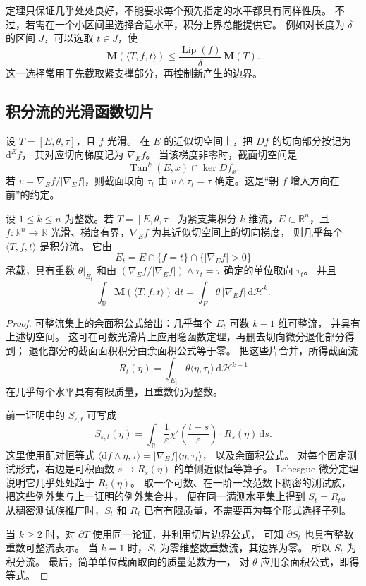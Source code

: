 定理只保证几乎处处良好，不能要求每个预先指定的水平都具有同样性质。
不过，若需在一个小区间里选择合适水平，积分上界总能提供它。
例如对长度为 \(\delta\) 的区间 \(J\)，可以选取 \(t\in J\)，使
\[
 \mathbf M(\langle T,f,t\rangle)
       \leq \frac{\operatorname{Lip}(f)}{\delta}\,\mathbf M(T).
\]
这一选择常用于先截取紧支撑部分，再控制新产生的边界。

\subsection{积分流的光滑函数切片}
\label{b1:subsec:D10402}

设 \(T=[E,\theta,\tau]\)，且 \(f\) 光滑。
在 \(E\) 的近似切空间上，把 \(Df\) 的切向部分按记为 \(\mathrm{d}^Ef\)，
其对应切向梯度记为 \(\nabla_Ef\)。
当该梯度非零时，截面切空间是
\[
 \operatorname{Tan}^k(E,x)\cap\ker Df_x.
\]
若 \(v=\nabla_Ef/|\nabla_Ef|\)，则截面取向 \(\tau_t\) 由
\(v\wedge\tau_t=\tau\) 确定。这是“朝 \(f\) 增大方向在前”的约定。

\begin{theorem}\label{b1:thm:app-d-rectifiable-slicing}
设 \(1\le k\le n\) 为整数。若 \(T=[E,\theta,\tau]\) 为紧支集积分 \(k\) 维流，\(E\subset\mathbb R^n\)，且 \(f:\mathbb R^n\to\mathbb R\) 光滑、梯度有界，\(\nabla_E f\) 为其近似切空间上的切向梯度，
则几乎每个 \(\langle T,f,t\rangle\) 是积分流。
它由
\[
 E_t=E\cap\{f=t\}\cap\{|\nabla_Ef|>0\}
\]
承载，具有重数 \(\theta|_{E_t}\) 和由 \((\nabla_E f/|\nabla_E f|)\wedge\tau_t=\tau\) 确定的单位取向 \(\tau_t\)。
并且
\[
 \int_{\mathbb R}\mathbf M(\langle T,f,t\rangle)\,\mathrm{d}t
        =\int_E\theta\,|\nabla_Ef|\,\mathrm{d}\mathcal H^k.
\]
\end{theorem}
\begin{proof}
可整流集上的余面积公式给出：几乎每个 \(E_t\) 可数 \(k-1\) 维可整流，
并具有上述切空间。
这可在可数光滑片上应用隐函数定理，再删去切向微分退化部分得到；
退化部分的截面面积积分由余面积公式等于零。
把这些片合并，所得截面流
\[
 R_t(\eta)=\int_{E_t}\theta\langle\eta,\tau_t\rangle\,\mathrm{d}\mathcal H^{k-1}
\]
在几乎每个水平具有有限质量，且重数仍为整数。

前一证明中的 \(S_{\varepsilon,t}\) 可写成
\[
 S_{\varepsilon,t}(\eta)
    =\int_{\mathbb R}\frac1\varepsilon
          \chi'\!\left(\frac{t-s}{\varepsilon}\right)\cdot R_s(\eta)\,\mathrm{d}s.
\]
这里使用配对恒等式
\(\langle \mathrm{d}f\wedge\eta,\tau\rangle
 =|\nabla_Ef|\langle\eta,\tau_t\rangle\)，
以及余面积公式。
对每个固定测试形式，右边是可积函数 \(s\mapsto R_s(\eta)\) 的单侧近似恒等算子。
Lebesgue 微分定理说明它几乎处处趋于 \(R_t(\eta)\)。
取一个可数、在一阶一致范数下稠密的测试族，
把这些例外集与上一证明的例外集合并，
便在同一满测水平集上得到 \(S_t=R_t\)。
从稠密测试族推广时，\(S_t\) 和 \(R_t\) 已有有限质量，不需要再为每个形式选择子列。

当 \(k\geq2\) 时，对 \(\partial T\) 使用同一论证，并利用切片边界公式，
可知 \(\partial S_t\) 也具有整数重数可整流表示。
当 \(k=1\) 时，\(S_t\) 为零维整数重数流，其边界为零。
所以 \(S_t\) 为积分流。
最后，简单单位截面取向的质量范数为一，
对 \(\theta\) 应用余面积公式，即得等式。
\end{proof}

